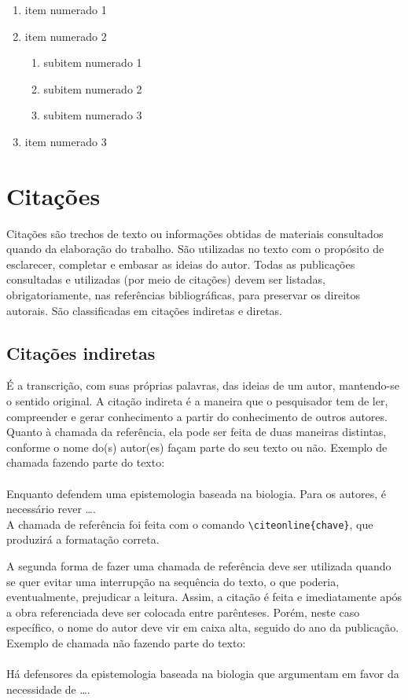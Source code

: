 \begin{enumerate}
    \item item numerado 1
    \item item numerado 2
    \begin{enumerate}
        \item subitem numerado 1
        \item subitem numerado 2
        \item subitem numerado 3
    \end{enumerate}
    \item item numerado 3
\end{enumerate}

\section{Citações}
\label{sec:citacoes}

Citações são trechos de texto ou informações obtidas de materiais consultados quando da elaboração do trabalho. São utilizadas no texto com o propósito de esclarecer, completar e embasar as ideias do autor. Todas as publicações consultadas e utilizadas (por meio de citações) devem ser listadas, obrigatoriamente, nas referências bibliográficas, para preservar os direitos autorais. São classificadas em citações indiretas e diretas.

\subsection{Citações indiretas}
\label{subsec:citacoes_indiretas}

É a transcrição, com suas próprias palavras, das ideias de um autor, mantendo-se o sentido original. A citação indireta é a maneira que o pesquisador tem de ler, compreender e gerar conhecimento a partir do conhecimento de outros autores. Quanto à chamada da referência, ela pode ser feita de duas maneiras distintas, conforme o nome do(s) autor(es) façam parte do seu texto ou não. Exemplo de chamada fazendo parte do texto: \\
\\Enquanto {} defendem uma epistemologia baseada na biologia. Para os autores, é necessário rever \ldots.\\

A chamada de referência foi feita com o comando \verb|\citeonline{chave}|, que produzirá a formatação correta.

A segunda forma de fazer uma chamada de referência deve ser utilizada quando se quer evitar uma interrupção na sequência do texto, o que poderia, eventualmente, prejudicar a leitura. Assim, a citação é feita e imediatamente após a obra referenciada deve ser colocada entre parênteses. Porém, neste caso específico, o nome do autor deve vir em caixa alta, seguido do ano da publicação. Exemplo de chamada não fazendo parte do texto: \\
\\Há defensores da epistemologia baseada na biologia que argumentam em favor da necessidade de \ldots \cite{MATURANA_2003}.\\

